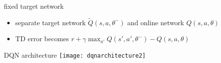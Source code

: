 \begin{frame}{fixed target network}

    
        \begin{itemize}
            \item separate target network  $\tilde{Q}(s, a, \theta^-)$  and online network  $Q(s, a, \theta)$ 
            \item TD error becomes  $r+\gamma\max_{a'} Q(s',a',\theta^-)-Q(s,a,\theta)$
        \end{itemize}
      

\end{frame}


\begin{frame}{DQN architecture}
\texttt{[image: dqnarchitecture2]}
\end{frame}

